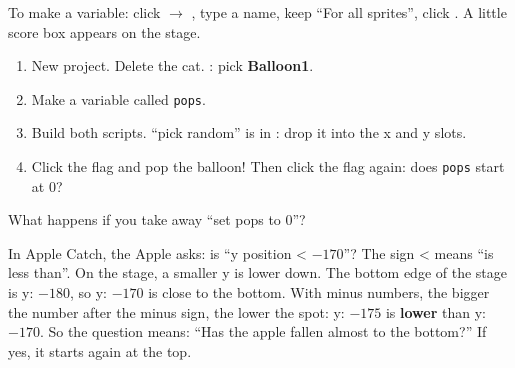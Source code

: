 To make a variable: click  $\rightarrow$ , type a name, keep \enquote{For all sprites}, click . A little score box appears on the stage.

\begin{exercise}
\begin{enumerate}[leftmargin=1.4em,itemsep=1pt]
  \item New project. Delete the cat. : pick \textbf{Balloon1}.
  \item Make a variable called \texttt{pops}.
  \item Build both scripts. \enquote{pick random} is in : drop it into the x and y slots.
  \item Click the flag and pop the balloon! Then click the flag again: does \texttt{pops} start at 0?
\end{enumerate}
\begin{center}
\begin{scratch}[scale=0.8]
\end{scratch}
\hspace{0.5cm}
\begin{scratch}[scale=0.8]
\end{scratch}
\end{center}
What happens if you take away \enquote{set pops to 0}? 
\end{exercise}

\begin{tip}
In Apple Catch, the Apple asks: is \enquote{y position < $-170$}? The sign < means \enquote{is less than}. On the stage, a smaller y is lower down. The bottom edge of the stage is y: $-180$, so y: $-170$ is close to the bottom. With minus numbers, the bigger the number after the minus sign, the lower the spot: y: $-175$ is \textbf{lower} than y: $-170$. So the question means: \enquote{Has the apple fallen almost to the bottom?} If yes, it starts again at the top.
\end{tip}


